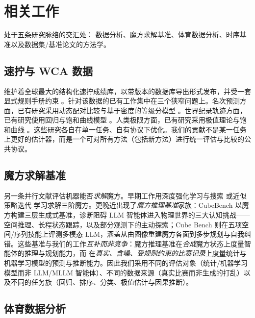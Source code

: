 \section{相关工作}
\label{sec:related}

\wcabench{} 处于五条研究脉络的交汇处：\wca{} 数据分析、魔方求解基准、体育数据分析、时序基准以及数据集/基准论文的方法学。

\subsection{速拧与 WCA 数据}
\label{sec:related-wca}

\wca{} 维护着全球最大的结构化速拧成绩库，以带版本的数据库导出形式发布，并受一套显式规则手册约束 \citep{wca_export, wca_regs}。针对该数据的已有工作集中在三个狭窄问题上。名次预测方面，已有研究采用动态配对比较与基于密度的等级分模型 \citep{glickman_rating}。世界纪录轨迹方面，已有研究使用回归与饱和曲线模型 \citep{tatem_sprint, nevill_running}。人类极限方面，已有研究采用极值理论与饱和曲线 \citep{evt_coles, nevill_running}。这些研究各自在单一任务、自有协议下优化。我们的贡献不是某一任务上更好的估计器，而是一个可对所有方法（包括新方法）进行统一评估与比较的公共协议。

\subsection{魔方求解基准}
\label{sec:related-cubebench}

另一条并行文献评估机器能否\emph{求解}魔方。早期工作用深度强化学习与搜索 \citep{deepcubea} 或近似策略迭代 \citep{mcaleer_cube} 学习求解三阶魔方。更晚近出现了\emph{魔方推理基准}家族：CubeBench \citep{cubebench} 以魔方构建三层生成式基准，诊断阻碍 LLM 智能体进入物理世界的三大认知挑战——空间推理、长程状态跟踪，以及部分观测下的主动探索；Cube Bench \citep{cube_bench_mllm} 则在五项空间/序列技能上评测多模态 LLM，涵盖从由图像重建魔方各面到多步规划与自我纠错。这些基准与我们的工作\emph{互补而非竞争}：魔方推理基准在\emph{合成}魔方状态上度量智能体的推理与规划能力，而 \wcabench{} 在\emph{真实、含噪、受规则约束的比赛记录}上度量统计与机器学习模型的预测与推断能力。因此我们采用不同的评估对象（统计/机器学习模型而非 LLM/MLLM 智能体）、不同的数据来源（真实比赛而非生成的打乱）以及不同的任务族（回归、排序、分类、极值估计与因果推断）。

\subsection{体育数据分析}
\label{sec:related-sports}

